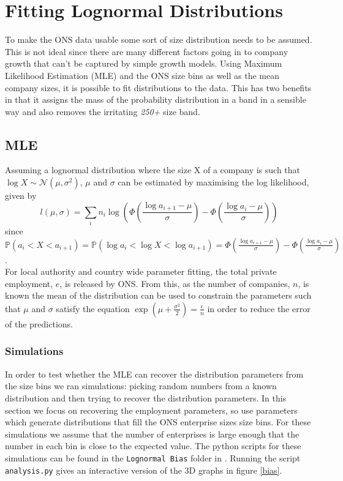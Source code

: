 \documentclass[a4paper,10pt]{article}
\begin{document}
   \section{Fitting Lognormal Distributions}
   To make the ONS data usable some sort of size distribution needs to be assumed. This is not ideal since there are many different factors going in to company growth that can't be captured by simple growth models. Using Maximum Likelihood Estimation (MLE) and the ONS size bins as well as the mean company sizes, it is possible to fit distributions to the data. This has two benefits in that it assigns the mass of the probability distribution in a band in a sensible way and also removes the irritating \emph{250+} size band.
   
   \subsection{MLE}
  
   Assuming a lognormal distribution where the size X of a company is such that $\log X \sim \mathcal{N}(\mu, \sigma^2)$, $\mu$ and $\sigma$ can be estimated by maximising the log likelihood, given by
   \begin{equation}
   l(\mu, \sigma) = \sum_i n_i \log \left( \Phi \left( \frac{\log a_{i + 1} - \mu}{\sigma} \right) - \Phi \left( \frac{\log a_{i} - \mu}{\sigma} \right) \right)
   \end{equation}
   since $\mathbb{P}(a_i < X < a_{i + 1}) = \mathbb{P}(\log a_i < \log X < \log a_{i + 1}) = \Phi \left( \frac{\log a_{i + 1} - \mu}{\sigma} \right) - \Phi \left( \frac{\log a_{i} - \mu}{\sigma} \right)$. \\
 For local authority and country wide parameter fitting, the total private employment, $e$, is released by ONS. From this, as the number of companies, $n$, is known the mean of the distribution can be used to constrain the parameters such that $\mu$ and $\sigma$ satisfy the equation $\exp(\mu + \frac{\sigma^2}{2}) = \frac{e}{n}$ in order to reduce the error of the predictions.

   \subsubsection{Simulations}

   In order to test whether the MLE can recover the distribution parameters from the size bins we ran simulations: picking random numbers from a known distribution and then trying to recover the distribution parameters. In this section we focus on recovering the employment parameters, so use parameters which generate distributions that fill the ONS enterprise sizes size bins. For these simulations we assume that the number of enterprises is large enough that the number in each bin is close to the expected value. The python scripts for these simulations can be found in the \texttt{Lognormal Bias} folder in \cite{github}. Running the script \texttt{analysis.py} gives an interactive version of the 3D graphs in figure \ref{bias}.
\end{document}
